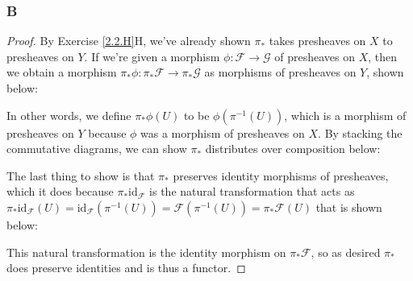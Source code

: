 \documentclass{article}
\newcommand{\id}{\mathrm{id}}
\newcommand{\fF}{\mathscr{F}}
\newcommand{\fG}{\mathscr{G}}
\newcommand{\fH}{\mathscr{H}}
\DeclareMathOperator{\res}{res}
\begin{document}
\subsubsection{B}\label{2.3.B}
\begin{proof}
    By Exercise \ref{2.2.H}H, we've already shown $\pi_*$ takes presheaves on $X$ to presheaves on $Y$. If we're given a morphism $\phi:\fF\to \fG$ of presheaves on $X$, then we obtain a morphism $\pi_* \phi:\pi_* \fF\to \pi_* \fG$ as morphisms of presheaves on $Y$, shown below:
    \begin{center}
    \end{center}
    In other words, we define $\pi_*\phi(U)$ to be $\phi(\pi^{-1}(U))$, which is a morphism of presheaves on $Y$ because $\phi$ was a morphism of presheaves on $X$. By stacking the commutative diagrams, we can show $\pi_*$ distributes over composition below:
    \begin{center}
    \end{center}
    The last thing to show is that $\pi_*$ preserves identity morphisms of presheaves, which it does because $\pi_*\id_{\fF}$ is the natural transformation that acts as $\pi_*\id_{\fF}(U)=\id_{\fF}(\pi^{-1}(U))=\fF(\pi^{-1}(U))=\pi_*\fF(U)$ that is shown below:
    \begin{center}
    \end{center}
    This natural transformation is the identity morphism on $\pi_*\fF$, so as desired $\pi_*$ does preserve identities and is thus a functor.
\end{proof}
\end{document}

